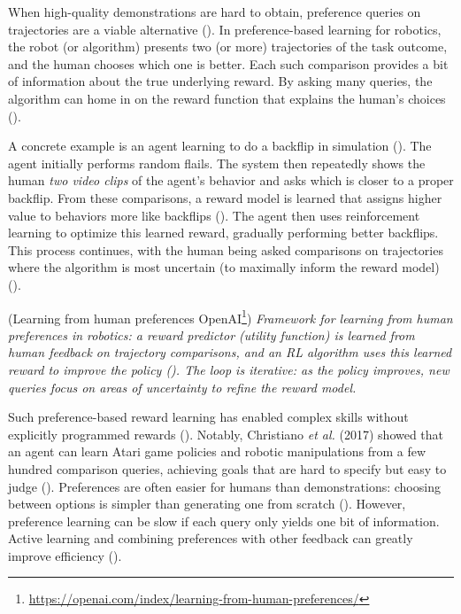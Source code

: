 \documentclass[
  letterpaper,
  numbers=noenddot,
  DIV=11]{scrreprt}
\theoremstyle{plain}
\theoremstyle{definition}
\theoremstyle{remark}
\DeclareRobustCommand{\href}[2]{#2\footnote{\url{#1}}}
\begin{document}
When high-quality demonstrations are hard to obtain, preference queries
on trajectories are a viable alternative
(). In
preference-based learning for robotics, the robot (or algorithm)
presents two (or more) trajectories of the task outcome, and the human
chooses which one is better. Each such comparison provides a bit of
information about the true underlying reward. By asking many queries,
the algorithm can home in on the reward function that explains the
human's choices
().

A concrete example is an agent learning to do a backflip in simulation
(). The agent
initially performs random flails. The system then repeatedly shows the
human \emph{two video clips} of the agent's behavior and asks which is
closer to a proper backflip. From these comparisons, a reward model is
learned that assigns higher value to behaviors more like backflips
(). The agent
then uses reinforcement learning to optimize this learned reward,
gradually performing better backflips. This process continues, with the
human being asked comparisons on trajectories where the algorithm is
most uncertain (to maximally inform the reward model)
().

(\href{https://openai.com/index/learning-from-human-preferences/}{Learning
from human preferences \textbar{} OpenAI}) \emph{Framework for learning
from human preferences in robotics: a reward predictor (utility
function) is learned from human feedback on trajectory comparisons, and
an RL algorithm uses this learned reward to improve the policy
(). The loop is
iterative: as the policy improves, new queries focus on areas of
uncertainty to refine the reward model.}

Such preference-based reward learning has enabled complex skills without
explicitly programmed rewards
(). Notably,
Christiano \emph{et al.} (2017) showed that an agent can learn Atari
game policies and robotic manipulations from a few hundred comparison
queries, achieving goals that are hard to specify but easy to judge
(). Preferences
are often easier for humans than demonstrations: choosing between
options is simpler than generating one from scratch
().
However, preference learning can be slow if each query only yields one
bit of information. Active learning and combining preferences with other
feedback can greatly improve efficiency
().
\end{document}
